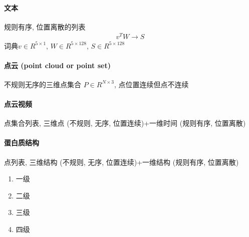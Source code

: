 \paragraph{文本}
规则有序, 位置离散的列表
\begin{align*}
    v^T W \rightarrow S
\end{align*}
词典$v\in R^{5\times 1}$, $W\in R^{5\times 128}$, $S \in R^{5\times 128}$

\paragraph{点云 (point cloud or point set)}
不规则无序的三维点集合 $P \in R^{N\times 3}$, 点位置连续但点不连续

\paragraph{点云视频}
点集合列表, 三维点 (不规则, 无序, 位置连续)+一维时间 (规则有序, 位置离散)

\paragraph{蛋白质结构} 
点列表, 三维结构 (不规则, 无序, 位置连续)+一维结构 (规则有序, 位置离散)
\begin{enumerate}
    \item 一级
    \item 二级
    \item 三级
    \item 四级
\end{enumerate}





